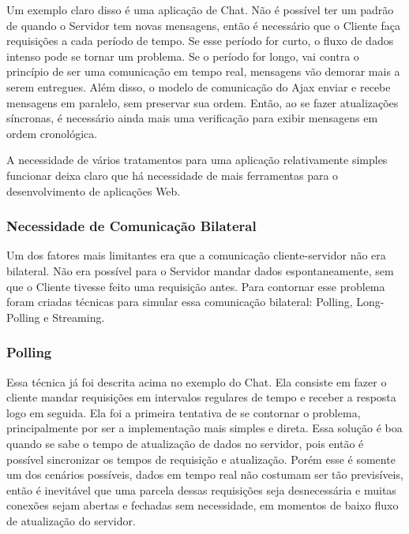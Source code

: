 \documentclass[a4paper,12pt]{article}
\begin{document}
Um exemplo claro disso é uma aplicação de Chat. Não é possível ter um padrão de quando o Servidor tem novas mensagens, então é necessário que o Cliente faça requisições a cada período de tempo. Se esse período for curto, o fluxo de dados intenso pode se tornar um problema. Se o período for longo, vai contra o princípio de ser uma comunicação em tempo real, mensagens vão demorar mais a serem entregues. Além disso, o modelo de comunicação do Ajax enviar e recebe mensagens em paralelo, sem preservar sua ordem. Então, ao se fazer atualizações síncronas, é necessário ainda mais uma verificação para exibir mensagens em ordem cronológica.

A necessidade de vários tratamentos para uma aplicação relativamente simples funcionar deixa claro que há necessidade de mais ferramentas para o desenvolvimento de aplicações Web.


\subsubsection{Necessidade de Comunicação Bilateral}



Um dos fatores mais limitantes era que a comunicação cliente-servidor não era bilateral. Não era possível para o Servidor mandar dados espontaneamente, sem que o Cliente tivesse feito uma requisição antes. Para contornar esse problema foram criadas técnicas para simular essa comunicação bilateral: Polling, Long-Polling e Streaming.

\subsubsection{Polling}

Essa técnica já foi descrita acima no exemplo do Chat. Ela consiste em fazer o cliente mandar requisições em intervalos regulares de tempo e receber a resposta logo em seguida. Ela foi a primeira tentativa de se contornar o problema, principalmente por ser a implementação mais simples e direta. Essa solução é boa quando se sabe o tempo de atualização de dados no servidor, pois então é possível sincronizar os tempos de requisição e atualização. Porém esse é somente um dos cenários possíveis, dados em tempo real não costumam ser tão previsíveis, então é inevitável que uma parcela dessas requisições seja desnecessária e muitas conexões sejam abertas e fechadas sem necessidade, em momentos de baixo fluxo de atualização do servidor.
\end{document}
